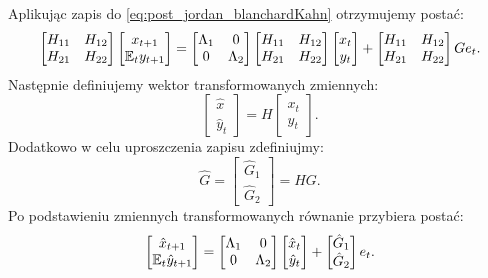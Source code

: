 Aplikując zapis do \eqref{eq:post_jordan_blanchardKahn} otrzymujemy postać:
\begin{equation}
    \begin{bmatrix}
    H_{11} & H_{12} \\
    H_{21} & H_{22}
    \end{bmatrix}
    \begin{bmatrix}
    x_{t+1} \\
    \mathbb{E}_t y_{t+1}
\end{bmatrix} = \begin{bmatrix}
    \Lambda_{1} & 0 \\
    0 & \Lambda_{2}
    \end{bmatrix} \begin{bmatrix}
    H_{11} & H_{12} \\
    H_{21} & H_{22}
    \end{bmatrix} \begin{bmatrix}
    x_{t} \\
    y_{t}
\end{bmatrix} + \begin{bmatrix}
    H_{11} & H_{12} \\
    H_{21} & H_{22}
    \end{bmatrix} G e_t.
\end{equation}
Następnie definiujemy wektor transformowanych zmiennych:
\begin{equation}
\label{eqn:bk-transform}
    \begin{bmatrix}
    \hat{x}_{} \\
    \hat{y}_{t}
    \end{bmatrix} = H \begin{bmatrix}
    x_{t} \\
    y_{t}
\end{bmatrix}.
\end{equation}
Dodatkowo w celu uproszczenia zapisu zdefiniujmy:
\begin{equation}
    \hat{G} = \begin{bmatrix}
        \hat{G}_1 \\
        \hat{G}_2
    \end{bmatrix} = H G.
\end{equation}
Po podstawieniu zmiennych transformowanych równanie przybiera postać:
\begin{equation}
    \begin{bmatrix}
    \hat{x}_{t+1} \\
    \mathbb{E}_t \hat{y}_{t+1}
\end{bmatrix} = \begin{bmatrix}
    \Lambda_{1} & 0 \\
    0 & \Lambda_{2}
    \end{bmatrix} \begin{bmatrix}
    \hat{x}_{t} \\
    \hat{y}_{t}
\end{bmatrix} + \begin{bmatrix}
        \hat{G}_1 \\
        \hat{G}_2
    \end{bmatrix} e_t.
\end{equation}
